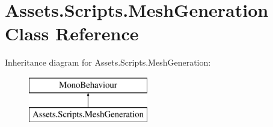 \hypertarget{class_assets_1_1_scripts_1_1_mesh_generation}{}\section{Assets.\+Scripts.\+Mesh\+Generation Class Reference}
\label{class_assets_1_1_scripts_1_1_mesh_generation}
Inheritance diagram for Assets.\+Scripts.\+Mesh\+Generation\+:\begin{figure}[H]
\begin{center}
\leavevmode
\includegraphics[height=2.000000cm]{class_assets_1_1_scripts_1_1_mesh_generation}
\end{center}
\end{figure}

